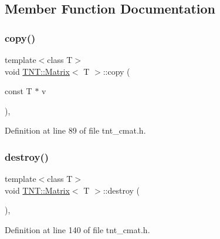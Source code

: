 \subsection{Member Function Documentation}
\mbox{\label{classTNT_1_1Matrix_ab14f23495e591b50b73574e154a178a7}} 
\subsubsection{\texorpdfstring{copy()}{copy()}}
{\footnotesize\ttfamily template$<$class T$>$ \\
void \hyperlink{classTNT_1_1Matrix}{T\+N\+T\+::\+Matrix}$<$ T $>$\+::copy (\begin{DoxyParamCaption}\item[{const T $\ast$}]{v }\end{DoxyParamCaption})\hspace{0.3cm}{\ttfamily [inline]}, {\ttfamily [protected]}}



Definition at line 89 of file tnt\+\_\+cmat.\+h.

\mbox{\label{classTNT_1_1Matrix_a44f6121414c93eb548b0bd82a03e7ecc}} 
\subsubsection{\texorpdfstring{destroy()}{destroy()}}
{\footnotesize\ttfamily template$<$class T$>$ \\
void \hyperlink{classTNT_1_1Matrix}{T\+N\+T\+::\+Matrix}$<$ T $>$\+::destroy (\begin{DoxyParamCaption}{ }\end{DoxyParamCaption})\hspace{0.3cm}{\ttfamily [inline]}, {\ttfamily [protected]}}



Definition at line 140 of file tnt\+\_\+cmat.\+h.

\mbox{\label{classTNT_1_1Matrix_a2456a496665b63c4f3f224a3c918dbe9}} 
